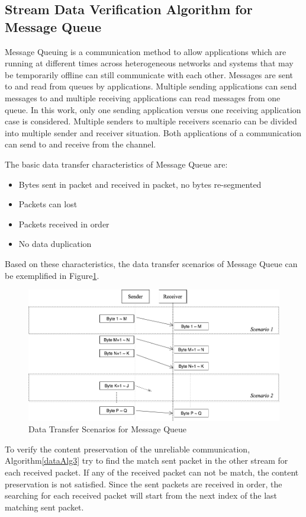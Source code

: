 \subsection{Stream Data Verification Algorithm for  Message Queue }
Message Queuing is a communication method to allow applications which are running at different times across heterogeneous networks and systems that may be temporarily offline can still communicate with each other. Messages are sent to and read from queues by applications. Multiple sending applications can send messages to and multiple receiving applications can read messages from one queue.\cite{redkar2004pro} In this work, only one sending application versus one receiving application case is considered. Multiple senders to multiple receivers scenario can be divided into multiple sender and receiver situation. Both applications of a communication can send to and receive from the channel.

The basic data transfer characteristics of Message Queue are:
\begin{itemize}
  \item Bytes sent in packet and received in packet, no bytes re-segmented
  \item Packets can lost
  \item Packets received in order
  \item No data duplication
\end{itemize}
Based on these characteristics, the data transfer scenarios of Message Queue can be exemplified in Figure\ref{msmq}.
\begin{figure}[H]
\centerline{\includegraphics[scale=0.4]{Figures/msmq}}
\caption{Data Transfer Scenarios for Message Queue}
\label{msmq}
\end{figure}

To verify the content preservation of the unreliable communication, Algorithm\ref{dataAlg3} try to find the match sent packet in the other stream for each received packet. If any of the received packet can not be match, the content preservation is not satisfied. Since the sent packets are received in order, the searching for each received packet will start from the next index of the last matching sent packet.

